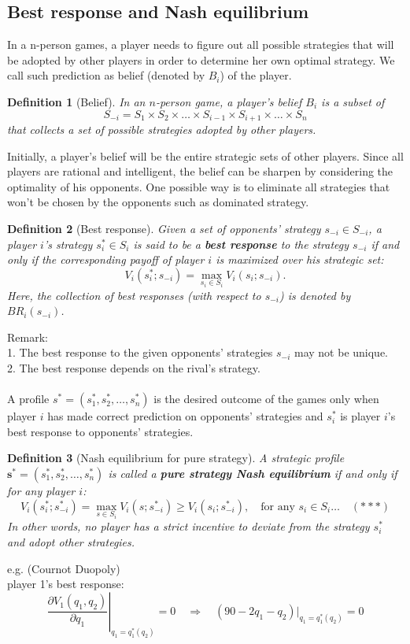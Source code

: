 \documentclass[twoside]{article}
\theoremstyle{definitionstyle}
\newtheorem*{definition}{Definition}
\begin{document}
\subsection{Best response and Nash equilibrium}
In a n-person games, a player needs to figure out all possible strategies that 
will be adopted by other players in order to determine her own optimal strategy. We call such prediction as belief (denoted by $B_i$) of the player. 
\begin{definition}[Belief]
In an $n$-person game, a player's belief $B_i$ is a subset of 
\[
S_{-i} = S_1 \times S_2 \times \dots \times S_{i-1} \times S_{i+1} \times \dots \times S_n
\]
that collects a set of possible strategies adopted by other players.
\end{definition}
Initially, a player's belief will be the entire strategic sets of other players. Since all players are rational and intelligent, the belief can be sharpen by considering the optimality of his opponents. One possible way is to eliminate all strategies that won't be chosen by the opponents such as dominated strategy. 
\begin{definition}[Best response]
   Given a set of opponents' strategy $s_{-i} \in S_{-i}$, a player $i$'s strategy $s_i^* \in S_i$ is said to be a \textbf{best response} to the strategy $s_{-i}$ if and only if the corresponding payoff of player $i$ is maximized over his strategic set:
\[
V_i(s_i^*; s_{-i}) = \max_{s_i \in S_i} V_i(s_i; s_{-i}).
\]
Here, the collection of best responses (with respect to $s_{-i}$) is denoted by $BR_i(s_{-i})$.

\end{definition}
Remark:\\
1. The best response to the given opponents' strategies $s_{-i}$ may not be 
unique. \\
2. The best response depends on the rival's strategy.  \\
\\
A profile $s^* = (s_1^*, s_2^*, \dots, s_n^*)$ is the desired outcome of the games only when player $i$ has made correct prediction on opponents' strategies and $s_i^*$ is player $i$'s best response to opponents' strategies.
\begin{definition}[Nash equilibrium for pure strategy]
   A strategic profile $\mathbf{s}^* = (s_1^*, s_2^*, \dots, s_n^*)$ is called a \textbf{pure strategy Nash equilibrium} if and only if for any player $i$:
\[
V_i(s_i^*; s_{-i}^*) = \max_{s \in S_i} V_i(s; s_{-i}^*) \geq V_i(s_i; s_{-i}^*), \quad \text{for any } s_i \in S_i\ldots \quad (\ast\ast\ast)
\]
In other words, no player has a strict incentive to deviate from the strategy $s_i^*$ and adopt other strategies.
\end{definition}
e.g. (Cournot Duopoly)\\
player 1's best response: 
\[
\left.\frac{\partial V_1(q_1, q_2)}{\partial q_1}\right|_{q_1 = q_1^*(q_2)} = 0 
\quad\Rightarrow\quad (90 - 2q_1 - q_2)\Big|_{q_1 = q_1^*(q_2)} = 0
\]
\end{document}
